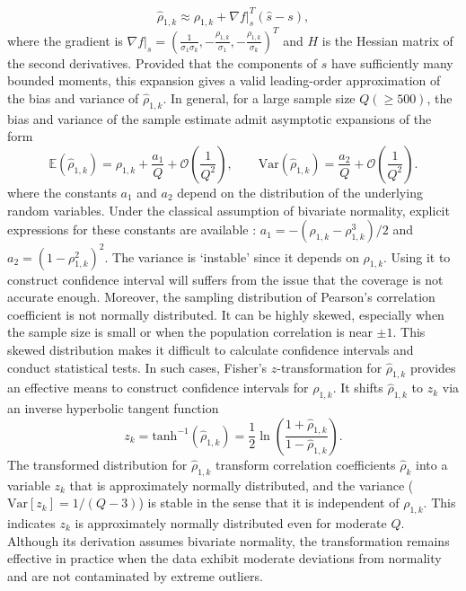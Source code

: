 %
\begin{equation}
\label{eq:Correlated_Coeff_approx}
  \widehat\rho_{1,k} \approx \rho_{1,k} + \nabla f |_{s}^T \left(\widehat s-s\right), 
\end{equation}
%
where the gradient is $\nabla f|_{s} = (\frac{1}{\sigma_1\sigma_k},-\frac{\rho_{1,k}}{\sigma_1},-\frac{\rho_{1,k}}{\sigma_k} )^T$ and $H$ is the Hessian matrix of the second derivatives. Provided that the components of $\widehat s$ have sufficiently many bounded moments, this expansion gives a valid leading-order approximation of the bias and variance of $\widehat \rho_{1,k}$. In general, for a large sample size $Q (\ge 500)$,  the bias and variance of the sample estimate admit asymptotic expansions of the form
%
\begin{equation*}
\label{eq:Expectation_var_rho}
    \mathbb{E}\left(\widehat \rho_{1,k}\right) =\rho_{1,k}+\frac{a_1}{Q} + \mathcal{O}\left(\frac 1 {Q^2}\right),\qquad \text{Var}\left(\widehat \rho_{1,k}\right)= \frac{a_2}{Q} + \mathcal{O}\left(\frac{1}{Q^2}\right).
\end{equation*}
%
where the constants $a_1$ and $a_2$ depend on the distribution of the underlying random variables. Under the classical assumption of bivariate normality, explicit expressions for these constants are available \cite{Fi:1915, Ha:2007, Ri:1932, So:1913}: $a_1 = -(\rho_{1,k} - \rho_{1,k}^3)/2$ and $a_2 = (1 - \rho_{1,k}^2)^2$. The variance is `instable' since it depends on $\rho_{1,k}$. Using it to construct confidence interval will suffers from the issue that the coverage is not accurate enough. Moreover, the sampling distribution of Pearson's correlation coefficient is not normally distributed. It can be highly skewed, especially when the sample size is small or when the population correlation is near $\pm 1$. This skewed distribution makes it difficult to calculate confidence intervals and conduct statistical tests. In such cases, Fisher's $z$-transformation \cite{Fi:1915, Fi:1921} for $\widehat \rho_{1,k}$ provides an effective means to construct confidence intervals for $\rho_{1,k}$. It shifts $\widehat\rho_{1,k}$ to $z_k$ via an inverse hyperbolic tangent function
%
\begin{equation}
\label{eq:Fisher_z}
    z_k  = \text{tanh}^{-1}\left(\widehat\rho_{1,k}\right) = \frac 1 2\ln \left(\frac{1+\widehat\rho_{1,k}}{1-\widehat\rho_{1,k}}\right).
\end{equation}
%
The transformed distribution for $\widehat \rho_{1,k}$ transform correlation coefficients $\widehat \rho_k$ into a variable $z_k$ that is approximately normally distributed, and the variance ($\text{Var}[z_k] = 1/(Q - 3)$) is stable in the sense that it is independent of $\rho_{1,k}$. This indicates $z_k$ is approximately normally distributed even for moderate $Q$. Although its derivation assumes bivariate normality, the transformation remains effective in practice when the data exhibit moderate deviations from normality and are not contaminated by extreme outliers. 

